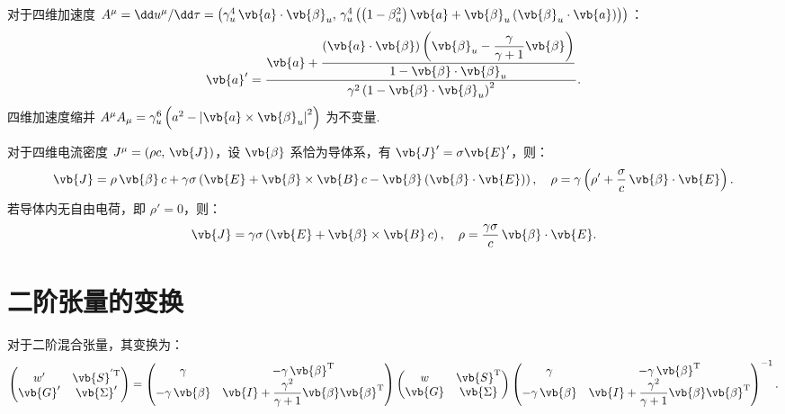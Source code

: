 \begin{exbox}
	对于四维加速度 \(A^\mu = \dd u^\mu/\dd \tau = \left( \gamma_u^4 \, \vb{a} \cdot \vb{\beta}_u, \, \gamma_u^4 \left( \left(1 - \beta_u^2\right) \vb{a} + \vb{\beta}_u \left( \vb{\beta}_u \cdot \vb{a} \right) \right) \right)\)：
	\begin{align*}
		\vb{a}' = \dfrac{ \vb{a} + \dfrac{ \left( \vb{a} \cdot \vb{\beta} \right) \left( \vb{\beta}_u - \dfrac{\gamma}{\gamma + 1} \vb{\beta} \right) }{ 1 - \vb{\beta} \cdot \vb{\beta}_u } }{ \gamma^2 \left( 1 - \vb{\beta} \cdot \vb{\beta}_u \right)^2 }.
	\end{align*}
	四维加速度缩并 \(A^\mu A_\mu = \gamma_u^6 \left( a^2 - \left| \vb{a} \times \vb{\beta}_u \right|^2 \right)\) 为不变量.
\end{exbox}

\begin{exbox}
	对于四维电流密度 \(J^\mu = (\rho c, \, \vb{J})\)，设 \(\vb{\beta}\) 系恰为导体系，有 \(\vb{J}' = \sigma \vb{E}'\)，则：
	\begin{align*}
		\vb{J} = \rho \, \vb{\beta} \, c + \gamma \sigma \left( \vb{E} + \vb{\beta} \times \vb{B} \, c - \vb{\beta} \left( \vb{\beta} \cdot \vb{E} \right) \right), \quad
		\rho = \gamma \left( \rho' + \dfrac{\sigma}{c} \, \vb{\beta} \cdot \vb{E} \right).
	\end{align*}
	若导体内无自由电荷，即 \(\rho' = 0\)，则：
	\begin{align*}
		\vb{J} = \gamma \sigma \left( \vb{E} + \vb{\beta} \times \vb{B} \, c \right), \quad
		\rho = \dfrac{\gamma \sigma}{c} \, \vb{\beta} \cdot \vb{E}.
	\end{align*}
\end{exbox}

\section{二阶张量的变换}

对于二阶混合张量，其变换为：
\begin{align*}
	\begin{pmatrix}
		w'      & \vb{S}^\mathrm{'T} \\
		\vb{G}' & \vb{\Sigma}'
	\end{pmatrix}
	=
	\begin{pmatrix}
		\gamma                & -\gamma \, \vb{\beta}^\mathrm{T}                                       \\
		-\gamma \, \vb{\beta} & \vb{I} + \dfrac{\gamma^2}{\gamma + 1} \vb{\beta} \vb{\beta}^\mathrm{T}
	\end{pmatrix}
	\begin{pmatrix}
		w      & \vb{S}^\mathrm{T} \\
		\vb{G} & \vb{\Sigma}
	\end{pmatrix}
	\begin{pmatrix}
		\gamma                & -\gamma \, \vb{\beta}^\mathrm{T}                                       \\
		-\gamma \, \vb{\beta} & \vb{I} + \dfrac{\gamma^2}{\gamma + 1} \vb{\beta} \vb{\beta}^\mathrm{T}
	\end{pmatrix}^{-1}.
\end{align*}

